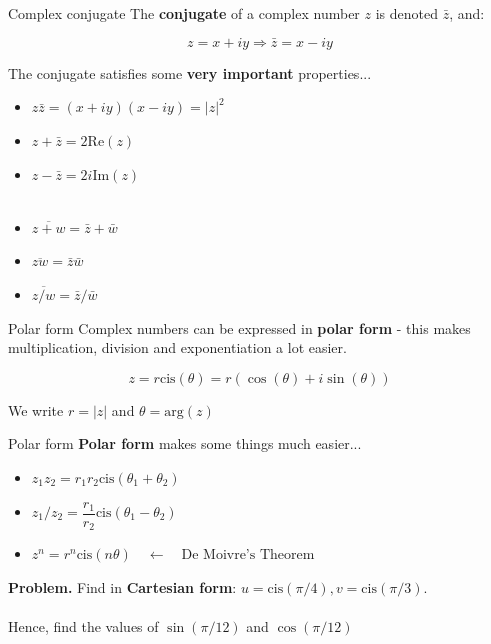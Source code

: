 \documentclass{beamer}
\begin{document}
\begin{frame}{Complex conjugate}
	The \textbf{conjugate} of a complex number $z$ is denoted $\bar{z}$, and:
	
	$$z = x + iy \Rightarrow \bar{z} = x - iy$$
	
	The conjugate satisfies some \textbf{very important} properties...
	\begin{itemize}
		\item $z\bar{z} = (x + iy)(x - iy) = |z|^2$
		\item $z + \bar{z} = 2\mathrm{Re}(z)$
		\item $z - \bar{z} = 2i\mathrm{Im}(z)$
		\\~\\
		\item $\overline{z + w} = \bar{z} + \bar{w}$
		\item $\overline{zw} = \bar{z}\bar{w}$
		\item $\overline{z/w} = \bar{z}/\bar{w}$
	\end{itemize}
	
	
\end{frame}

\begin{frame}{Polar form}
	Complex numbers can be expressed in \textbf{polar form} - this makes multiplication, division and exponentiation a lot easier.
	
	$$z = r\mathrm{cis}(\theta) = r(\cos(\theta) + i \sin(\theta))$$
	\vspace{5cm}
	
	We write $r = |z|$ and $\theta = \mathrm{arg}(z)$
\end{frame}

\begin{frame}{Polar form}
	\textbf{Polar form} makes some things much easier...
	\begin{itemize}
		\item $z_1 z_2 = r_1 r_2 \mathrm{cis}(\theta_1 + \theta_2)$
		\item $z_1/z_2 = \dfrac{r_1}{r_2}\mathrm{cis}(\theta_1 - \theta_2)$
		\item $z^n = r^n \mathrm{cis}(n\theta) \quad \leftarrow \quad \text{De Moivre's Theorem}$
	\end{itemize}
\end{frame}

\begin{frame}
	\textbf{Problem.} Find in \textbf{Cartesian form}: $u = \mathrm{cis}(\pi/4), v = \mathrm{cis}(\pi/3)$.\\~\\
	Hence, find the values of $\sin(\pi/12)$ and $\cos(\pi/12)$
	\vspace{5cm}
\end{frame}
\end{document}
